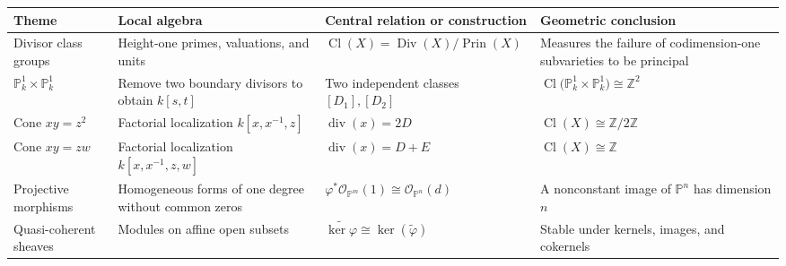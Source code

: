 \documentclass[12pt,a4paper]{article}
\theoremstyle{notespace}
\begin{document}
\begin{table}[htbp]
	\centering
	\renewcommand{\arraystretch}{1.5}
	\begin{adjustbox}{max width=\textwidth}
		\begin{tabular}{
				|>{\raggedright\arraybackslash}p{3.9cm}
				|>{\raggedright\arraybackslash}p{5.4cm}
				|>{\raggedright\arraybackslash}p{5.0cm}
				|>{\raggedright\arraybackslash}p{5.2cm}|
			}
			\hline
			\textbf{Theme}
			&
			\textbf{Local algebra}
			&
			\textbf{Central relation or construction}
			&
			\textbf{Geometric conclusion}
			\\
			\hline
			
			Divisor class groups
			&
			Height-one primes, valuations, and units
			&
			\(\displaystyle
			\operatorname{Cl}(X)
			=
			\operatorname{Div}(X)/
			\operatorname{Prin}(X)
			\)
			&
			Measures the failure of codimension-one subvarieties to be principal
			\\
			\hline
			
			\(\displaystyle \mathbb{P}^{1}_{k}\times\mathbb{P}^{1}_{k}\)
			&
			Remove two boundary divisors to obtain
			\(\displaystyle k[s,t]\)
			&
			Two independent classes
			\(\displaystyle [D_1], [D_2]\)
			&
			\(\displaystyle
			\operatorname{Cl}
			\bigl(
			\mathbb{P}^{1}_{k}\times\mathbb{P}^{1}_{k}
			\bigr)
			\cong
			\mathbb{Z}^{2}
			\)
			\\
			\hline
			
			Cone \(\displaystyle xy=z^{2}\)
			&
			Factorial localization
			\(\displaystyle k[x,x^{-1},z]\)
			&
			\(\displaystyle
			\operatorname{div}(x)=2D
			\)
			&
			\(\displaystyle
			\operatorname{Cl}(X)
			\cong
			\mathbb{Z}/2\mathbb{Z}
			\)
			\\
			\hline
			
			Cone \(\displaystyle xy=zw\)
			&
			Factorial localization
			\(\displaystyle k[x,x^{-1},z,w]\)
			&
			\(\displaystyle
			\operatorname{div}(x)=D+E
			\)
			&
			\(\displaystyle
			\operatorname{Cl}(X)
			\cong
			\mathbb{Z}
			\)
			\\
			\hline
			
			Projective morphisms
			&
			Homogeneous forms of one degree without common zeros
			&
			\(\displaystyle
			\varphi^{*}
			\mathcal{O}_{\mathbb{P}^{m}}(1)
			\cong
			\mathcal{O}_{\mathbb{P}^{n}}(d)
			\)
			&
			A nonconstant image of
			\(\displaystyle \mathbb{P}^{n}\)
			has dimension \(n\)
			\\
			\hline
			
			Quasi-coherent sheaves
			&
			Modules on affine open subsets
			&
			\(\displaystyle
			\widetilde{\ker\varphi}
			\cong
			\ker(\widetilde{\varphi})
			\)
			&
			Stable under kernels, images, and cokernels
			\\
			\hline
			

\end{tabular}
\end{adjustbox}
\end{table}
\end{document}

